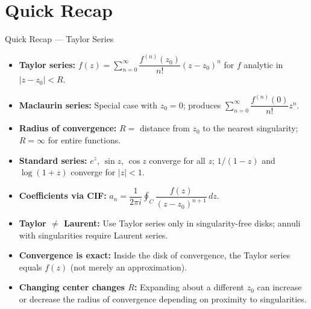 \documentclass[12pt,a4paper]{article}
\begin{document}
\section{Quick Recap}

\begin{learnbox}{Quick Recap --- Taylor Series}
\begin{itemize}[noitemsep]
  \item \textbf{Taylor series:} $f(z) = \displaystyle\sum_{n=0}^{\infty}\dfrac{f^{(n)}(z_0)}{n!}(z-z_0)^n$ for $f$ analytic in $|z-z_0|<R$.
  \item \textbf{Maclaurin series:} Special case with $z_0 = 0$; produces $\sum_{n=0}^{\infty}\dfrac{f^{(n)}(0)}{n!}z^n$.
  \item \textbf{Radius of convergence:} $R = $ distance from $z_0$ to the nearest singularity; $R=\infty$ for entire functions.
  \item \textbf{Standard series:} $e^z$, $\sin z$, $\cos z$ converge for all $z$; $1/(1-z)$ and $\log(1+z)$ converge for $|z|<1$.
  \item \textbf{Coefficients via CIF:} $a_n = \dfrac{1}{2\pi i}\oint_{C}\dfrac{f(z)}{(z-z_0)^{n+1}}\,dz$.
  \item \textbf{Taylor $\neq$ Laurent:} Use Taylor series only in singularity-free disks; annuli with singularities require Laurent series.
  \item \textbf{Convergence is exact:} Inside the disk of convergence, the Taylor series equals $f(z)$ (not merely an approximation).
  \item \textbf{Changing center changes $R$:} Expanding about a different $z_0$ can increase or decrease the radius of convergence depending on proximity to singularities.
\end{itemize}
\end{learnbox}
\end{document}
